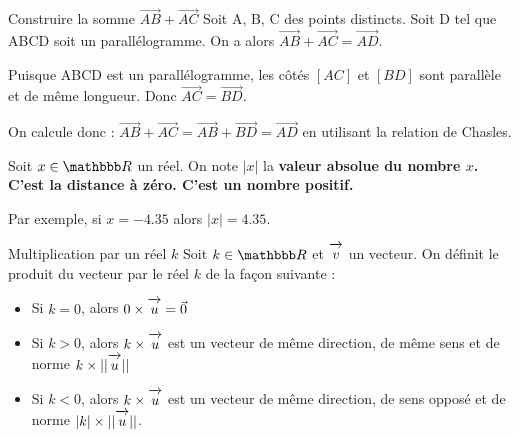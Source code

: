 \documentclass[10pt,a4paper,openany,twoside,prof]{book}
\begin{document}
\begin{prop}{Construire la somme $\vec{AB}+\vec{AC}$}{}
	Soit A, B, C des points distincts. Soit D tel que ABCD soit un parallélogramme. On a alors  $\vec{AB}+\vec{AC}=\vec{AD}$.
\end{prop}

\begin{dem}{}{}
	Puisque ABCD est un parallélogramme, les côtés $[AC]$ et $[BD]$ sont parallèle et de même longueur. Donc $\vec{AC} = \vec{BD}$.

	On calcule donc : $\vec{AB}+\vec{AC} = \vec{AB}+\vec{BD} = \vec{AD}$ en utilisant la relation de Chasles.

	\begin{center}
	\end{center}
\end{dem}

\begin{notation}{}{}
	Soit $x\in\R$ un réel. On note $|x|$ la \bf{valeur absolue} du nombre $x$. C'est la distance à zéro. C'est un nombre positif.

	Par exemple, si $x=-4.35$ alors $|x|=4.35$.
\end{notation}

\begin{defi}{Multiplication par un réel $k$}{}
	Soit $k\in\R$ et $\overrightarrow{\,\mathstrut v\,}$ un vecteur. On définit le produit du vecteur par le réel $k$ de la façon suivante :

	\begin{itemize}
		\item Si $k=0$, alors $0\times \overrightarrow{\,\mathstrut u\,} = \vec{0}$
		\item Si $k>0$, alors $k\times \overrightarrow{\,\mathstrut u\,}$ est un vecteur de même direction, de même sens et de norme $k\times||\overrightarrow{\,\mathstrut u\,}||$
		\item Si $k<0$, alors $k\times \overrightarrow{\,\mathstrut u\,}$ est un vecteur de même direction, de sens opposé et de norme $|k|\times||\overrightarrow{\,\mathstrut u\,}||$.
	\end{itemize}
\end{defi}
\end{document}
